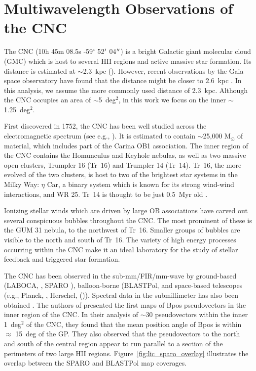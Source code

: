\section{Multiwavelength Observations of the CNC}\label{multiband comp}

The CNC (10h 45m 08.5s -59$^{\circ}$ 52$\operatorname{^{\prime}}$ 04$\operatorname{^{\prime\prime}}$) is a bright Galactic giant molecular cloud (GMC) which is host to several HII regions and active massive star formation. Its distance is estimated at $\sim$2.3~kpc (\citet{allen1993shape,smith2006structure}). However, recent observations by the Gaia space observatory have found that the distance might be closer to 2.6~kpc \citep{davidson2018gaia}. In this analysis, we assume the more commonly used distance of 2.3~kpc. Although the CNC occupies an area of $\sim$5~deg$^{2}$, in this work we focus on the inner $\sim$1.25~deg$^{2}$.

First discovered in 1752, the CNC has been well studied across the electromagnetic spectrum (see e.g., \citet{smith2008carina}). It is estimated to contain $\sim$25,000 M$_{\odot}$ of material, which includes part of the Carina OB1 association. The inner region of the CNC contains the Homunculus and Keyhole nebulas, as well as two massive open clusters, Trumpler 16 (Tr~16) and Trumpler 14 (Tr~14). Tr~16, the more evolved of the two clusters, is host to two of the brightest star systems in the Milky Way: $\eta$ Car, a binary system which is known for its strong wind-wind interactions, and WR 25. Tr~14 is thought to be just 0.5~Myr old \citep{preibisch2011hawk}.

Ionizing stellar winds which are driven by large OB associations have carved out several conspicuous bubbles throughout the CNC\@. The most prominent of these is the GUM 31 nebula, to the northwest of Tr~16. Smaller groups of bubbles are visible to the north and south of Tr~16. The variety of high energy processes occurring within the CNC make it an ideal laboratory for the study of stellar feedback and triggered star formation.

The CNC has been observed in the sub-mm/FIR/mm-wave by ground-based (LABOCA, \citep{preibisch2011laboca}, SPARO \citep{li2006results}), balloon-borne (BLASTPol, \citep{shariff2019submillimeter} and space-based telescopes (e.g., Planck, \citep{planck2014planck}, Herschel, (\citet{preibisch2012herschel,gaczkowski2013herschel,roccatagliata2013herschel})). Spectral data in the submillimeter has also been obtained \citep{oberst2006detection}. The authors of \citet{li2006results} presented the first maps of \gls{Bpos} pseudovectors in the inner region of the CNC\@. In their analysis of $\sim$30 pseudovectors within the inner 1~deg$^{2}$ of the CNC, they found that the mean position angle of \gls{Bpos} is within $\approx$ 15~deg of the GP\@. They also observed that the pseudovectors to the north and south of the central region appear to run parallel to a section of the perimeters of two large HII regions. Figure~\ref{fig:lic_sparo_overlay} illustrates the overlap between the SPARO and BLASTPol map coverages.

